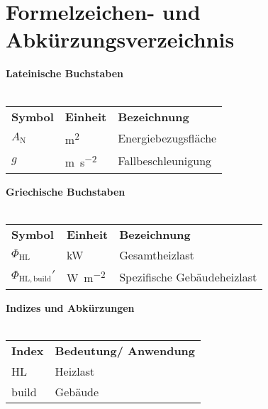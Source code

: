 \section*{Formelzeichen- und Abkürzungsverzeichnis}
	\textbf{Lateinische Buchstaben} \\ \\
	\begin{tabulary}{\textwidth}{LLL}
		\textbf{Symbol}&\textbf{Einheit}&\textbf{Bezeichnung}\\
		$A_\mathrm{N}$&\si{\square\meter}&Energiebezugsfläche\\
		$g$&\si{\meter\per\square\second}&Fallbeschleunigung\\
	\end{tabulary} \clearpage

	\textbf{Griechische Buchstaben} \\ \\
	\begin{tabulary}{\textwidth}{LLL}
		\textbf{Symbol}&\textbf{Einheit}&\textbf{Bezeichnung}\\
		$\Phi_\mathrm{HL}$&\si{\kilo\watt}&Gesamtheizlast\\
		$\Phi_\mathrm{HL,build}'$&\si{\watt\per\metre\squared}&Spezifische Gebäudeheizlast\\
	\end{tabulary} \clearpage
	
	\textbf{Indizes und Abkürzungen} \\ \\
	\begin{tabulary}{\textwidth}{LL}
		\textbf{Index}&\textbf{Bedeutung/ Anwendung}\\
		HL&Heizlast\\
		build&Gebäude\\
	\end{tabulary} \clearpage

	
